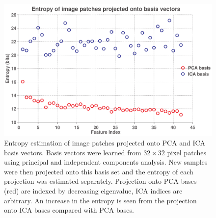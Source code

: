 \documentclass[10pt,twocolumn,letterpaper]{article}
\begin{document}
\begin{figure}[h]
\begin{center}
   \includegraphics[width=1.0\linewidth]{projent.pdf}
   \caption{Entropy estimation of image patches projected onto PCA and ICA basis vectors. Basis vectors were learned from $32\times 32$ pixel patches using principal and independent components analysis. New samples were then projected onto this basis set and the entropy of each projection was estimated separately. Projection onto PCA bases (red) are indexed by decreasing eigenvalue, ICA indices are arbitrary. An increase in the entropy is seen from the projection onto ICA bases compared with PCA bases.}
\label{fig:projent}
\end{center}
\end{figure}
\end{document}
